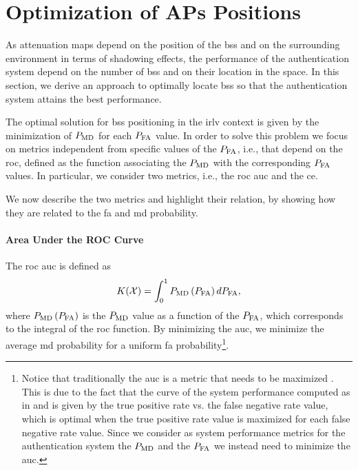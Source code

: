 \documentclass[twocolumns]{IEEEtran}
\begin{document}


\section{Optimization of APs Positions}\label{sec:bsPos}



As attenuation maps depend on the position of the \acp{bs} and on the surrounding environment in terms of shadowing effects, the performance of the authentication system depend on the number of \acp{bs} and on their location in the space. In this section, we derive an approach to optimally locate \acp{bs} so that the authentication system attains the best performance. 

The optimal solution for \acp{bs} positioning in the \ac{irlv} context is given by the minimization of $P_{\rm MD}$ for each $P_{\rm FA}$ value. In order to solve this problem we focus on metrics independent from specific values of the $P_{\rm FA}$, i.e., that depend on the \ac{roc}, defined as the  function associating the $P_{\rm MD}$ with the corresponding $P_{\rm FA}$ values. In particular, we consider two metrics, i.e., the   \ac{roc} \ac{auc} \cite{hanley-82} and the \ac{ce}. 

We now describe the two metrics and highlight their relation, by showing how they  are related to the \ac{fa} and \ac{md} probability.

\paragraph{Area Under the ROC Curve} The \ac{roc} \ac{auc} is defined as 
\begin{equation}
    K(\mathcal{X}) = \int_{0}^{1} P_{\rm MD}\left(P_{\rm FA}\right) d P_{\rm FA},
\end{equation}
where $P_{\rm MD}\left(P_{\rm FA}\right)$ is the $P_{\rm MD}$ value as a function of the $P_{\rm FA}$, which corresponds to the integral of the \ac{roc} function. By minimizing the \ac{auc}, we minimize the average \ac{md} probability for a uniform \ac{fa} probability\footnote{Notice that traditionally the \ac{auc} is a metric that needs to be maximized \cite{hanley-82}. This is due to the fact that the curve of the system performance computed as in \cite{hanley-82} and \cite{Kennedy-11} is given by the true positive rate vs. the false negative rate value, which is optimal when the true positive rate value is maximized for each false negative rate value. Since we consider as system performance metrics for the authentication system the $P_{\rm MD}$ and the $P_{\rm FA}$ we instead need to minimize the \ac{auc}.}. 
\end{document}
